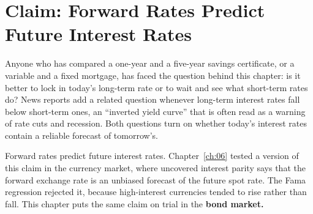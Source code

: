 \makeatletter
{}
\makeatother

\makeatletter
\makeatother

\chapter{Claim: Forward Rates Predict Future Interest Rates}
\label{ch:07}

Anyone who has compared a one-year and a five-year savings certificate, or a variable and a fixed mortgage, has faced the question behind this chapter: is it better to lock in today's long-term rate or to wait and see what short-term rates do? News reports add a related question whenever long-term interest rates fall below short-term ones, an ``inverted yield curve'' that is often read as a warning of rate cuts and recession. Both questions turn on whether today's interest rates contain a reliable forecast of tomorrow's.

Forward rates predict future interest rates. Chapter~\ref{ch:06} tested a version of this claim in the currency market, where uncovered interest parity says that the forward exchange rate is an unbiased forecast of the future spot rate. The Fama regression rejected it, because high-interest currencies tended to rise rather than fall. This chapter puts the same claim on trial in the \textbf{bond market.}

